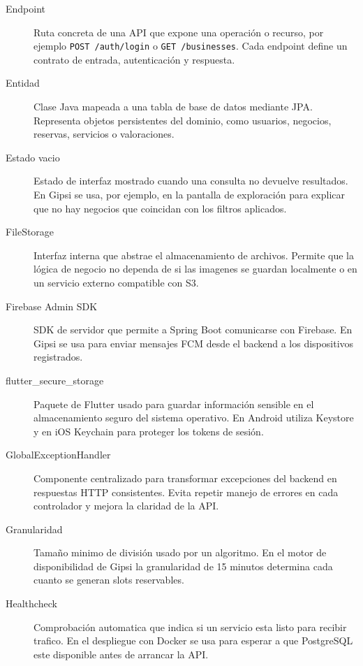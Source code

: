 \documentclass[12pt,a4paper,twoside]{report}
\begin{document}
\begin{description}
  \item[Endpoint]
  Ruta concreta de una API que expone una operaci\'on o recurso, por ejemplo
  \texttt{POST /auth/login} o \texttt{GET /businesses}. Cada endpoint define un contrato
  de entrada, autenticaci\'on y respuesta.

  \item[Entidad]
  Clase Java mapeada a una tabla de base de datos mediante JPA. Representa objetos
  persistentes del dominio, como usuarios, negocios, reservas, servicios o valoraciones.

  \item[Estado vacio]
  Estado de interfaz mostrado cuando una consulta no devuelve resultados. En Gipsi se usa,
  por ejemplo, en la pantalla de exploraci\'on para explicar que no hay negocios que
  coincidan con los filtros aplicados.

  \item[FileStorage]
  Interfaz interna que abstrae el almacenamiento de archivos. Permite que la l\'ogica de
  negocio no dependa de si las imagenes se guardan localmente o en un servicio externo
  compatible con S3.

  \item[Firebase Admin SDK]
  SDK de servidor que permite a Spring Boot comunicarse con Firebase. En Gipsi se usa
  para enviar mensajes FCM desde el backend a los dispositivos registrados.

  \item[flutter\_secure\_storage]
  Paquete de Flutter usado para guardar informaci\'on sensible en el almacenamiento seguro
  del sistema operativo. En Android utiliza Keystore y en iOS Keychain para proteger los
  tokens de sesi\'on.

  \item[GlobalExceptionHandler]
  Componente centralizado para transformar excepciones del backend en respuestas HTTP
  consistentes. Evita repetir manejo de errores en cada controlador y mejora la claridad
  de la API.

  \item[Granularidad]
  Tama\~no minimo de divisi\'on usado por un algoritmo. En el motor de disponibilidad
  de Gipsi la granularidad de 15 minutos determina cada cuanto se generan slots
  reservables.

  \item[Healthcheck]
  Comprobaci\'on automatica que indica si un servicio esta listo para recibir trafico.
  En el despliegue con Docker se usa para esperar a que PostgreSQL este disponible antes
  de arrancar la API.


\end{description}
\end{document}
